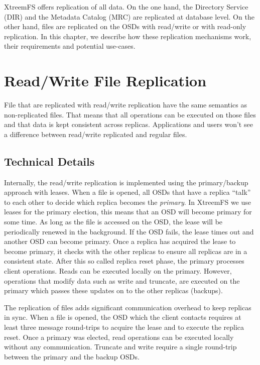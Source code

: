 \documentclass[a4paper,10pt]{book}
\begin{document}
XtreemFS offers replication of all data. On the one hand, the Directory Service (DIR) and the Metadata Catalog (MRC) are replicated at database level. On the other hand, files are replicated on the OSDs with read/write or with read-only replication. In this chapter, we describe how these replication mechanisms work, their requirements and potential use-cases.

\section{Read/Write File Replication}
\label{sec:readwrite_replication}
File that are replicated with read/write replication have the same semantics as non-replicated files. That means that all operations can be executed on those files and that data is kept consistent across replicas. Applications and users won't see a difference between read/write replicated and regular files.

\subsection{Technical Details}
Internally, the read/write replication is implemented using the primary/backup approach with leases. When a file is opened, all OSDs that have a replica ``talk'' to each other to decide which replica becomes the \textit{primary}. In XtreemFS we use leases for the primary election, this means that an OSD will become primary for some time. As long as the file is accessed on the OSD, the lease will be periodically renewed in the background. If the OSD fails, the lease times out and another OSD can become primary.
Once a replica has acquired the lease to become primary, it checks with the other replicas to ensure all replicas are in a consistent state. After this so called replica reset phase, the primary processes client operations.
Reads can be executed locally on the primary. However, operations that modify data such as write and truncate, are executed on the primary which passes these updates on to the other replicas (backups).

The replication of files adds significant communication overhead to keep replicas in sync. When a file is opened, the OSD which the client contacts requires at least three message round-trips to acquire the lease and to execute the replica reset. Once a primary was elected, read operations can be executed locally without any communication. Truncate and write require a single round-trip between the primary and the backup OSDs.
\end{document}
